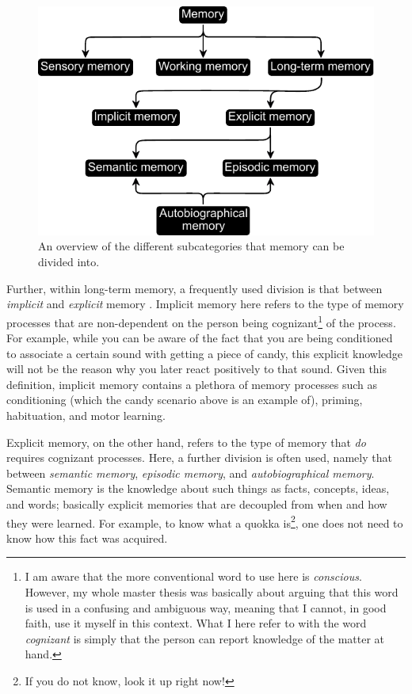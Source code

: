 \begin{figure} \centering \includegraphics[width=120mm]{./Figures/Memory_overview.pdf} \caption{An overview of the different subcategories that memory can be divided into.} \label{Figure:Memory_overview} \end{figure}

Further, within long-term memory, a frequently used division is that between \emph{implicit} and \emph{explicit} memory \parencite{Reder1996}. Implicit memory here refers to the type of memory processes that are non-dependent on the person being cognizant\footnote{I am aware that the more conventional word to use here is \emph{conscious}. However, my whole master thesis \parencite{Larsson2011} was basically about arguing that this word is used in a confusing and ambiguous way, meaning that I cannot, in good faith, use it myself in this context. What I here refer to with the word \emph{cognizant} is simply that the person can report knowledge of the matter at hand.} of the process. For example, while you can be aware of the fact that you are being conditioned to associate a certain sound with getting a piece of candy, this explicit knowledge will not be the reason why you later react positively to that sound. Given this definition, implicit memory contains a plethora of memory processes such as conditioning (which the candy scenario above is an example of), priming, habituation, and motor learning.

Explicit memory, on the other hand, refers to the type of memory that \emph{do} requires cognizant processes. Here, a further division is often used, namely that between \emph{semantic memory}, \emph{episodic memory}, and \emph{autobiographical memory}. Semantic memory is the knowledge about such things as facts, concepts, ideas, and words; basically explicit memories that are decoupled from when and how they were learned. For example, to know what a quokka is\footnote{If you do not know, look it up right now!}, one does not need to know how this fact was acquired.

